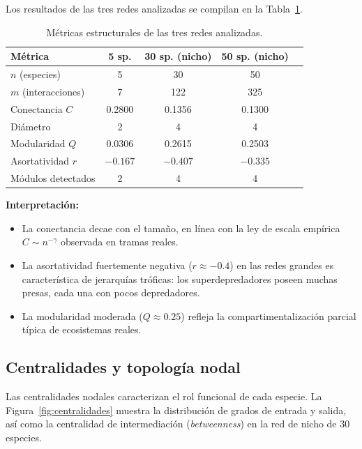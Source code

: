 \documentclass[12pt, a4paper]{article}
\begin{document}
Los resultados de las tres redes analizadas se compilan en la Tabla~\ref{tab:metricas}.

\begin{table}[H]
\centering
\caption{Métricas estructurales de las tres redes analizadas.}
\label{tab:metricas}
\renewcommand{\arraystretch}{1.3}
\begin{tabular}{lcccc}
\toprule
\textbf{Métrica} & \textbf{5 sp.} & \textbf{30 sp. (nicho)} & \textbf{50 sp. (nicho)} \\
\midrule
$n$ (especies)       & 5       & 30       & 50      \\
$m$ (interacciones)  & 7       & 122      & 325     \\
Conectancia $C$      & 0.2800  & 0.1356   & 0.1300  \\
Diámetro             & 2       & 4        & 4       \\
Modularidad $Q$      & 0.0306  & 0.2615   & 0.2503  \\
Asortatividad $r$    & $-0.167$  & $-0.407$ & $-0.335$ \\
Módulos detectados   & 2       & 4        & 4       \\
\bottomrule
\end{tabular}
\end{table}

\textbf{Interpretación:}
\begin{itemize}[noitemsep]
    \item La conectancia decae con el tamaño, en línea con la ley de escala empírica
          $C \sim n^{-\gamma}$ observada en tramas reales.
    \item La asortatividad fuertemente negativa ($r \approx -0.4$) en las redes grandes
          es característica de jerarquías tróficas: los superdepredadores poseen muchas
          presas, cada una con pocos depredadores.
    \item La modularidad moderada ($Q \approx 0.25$) refleja la compartimentalización
          parcial típica de ecosistemas reales.
\end{itemize}

\subsection{Centralidades y topología nodal}

Las centralidades nodales caracterizan el rol funcional de cada especie. La
Figura~\ref{fig:centralidades} muestra la distribución de grados de entrada y salida,
así como la centralidad de intermediación (\textit{betweenness}) en la red de nicho
de 30 especies.
\end{document}
